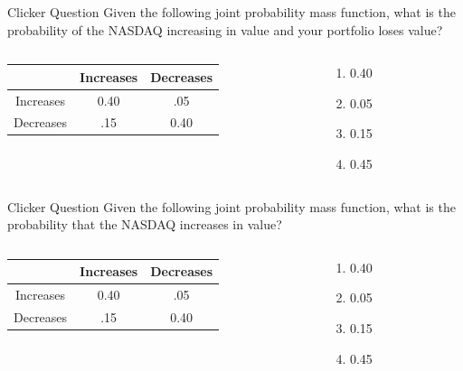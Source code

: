 \documentclass{beamer}
\begin{document}
\begin{frame}{Clicker Question}
	Given the following joint probability mass function, what is the probability of the NASDAQ increasing in value and your portfolio loses value?
	\begin{columns}
		\begin{column}{.8\textwidth}
			\begin{center}
				\begin{tabular}{ |c|c|c| }
					\hline
					\diagbox{NASDAQ}{Portfolio} & Increases & Decreases \\
					\hline
					Increases                        & 0.40      & .05       \\
					\hline
					Decreases                        & .15       & 0.40      \\
					\hline
				\end{tabular}
			\end{center}
		\end{column}
		\begin{column}{0.3\textwidth}
			\begin{enumerate}[label=(\alph*)]
				\item 0.40
				\item 0.05
				\item 0.15
				\item 0.45
			\end{enumerate}
		\end{column}
	\end{columns}
\end{frame}

\begin{frame}{Clicker Question}
	Given the following joint probability mass function, what is the probability that the NASDAQ increases in value?
	\begin{columns}
		\begin{column}{.8\textwidth}
			\begin{center}
				\begin{tabular}{ |c|c|c| }
					\hline
					\diagbox{NASDAQ}{Portfolio} & Increases & Decreases \\
					\hline
					Increases                        & 0.40      & .05       \\
					\hline
					Decreases                        & .15       & 0.40      \\
					\hline
				\end{tabular}
			\end{center}
		\end{column}

		\begin{column}{0.3\textwidth}
			\begin{enumerate}[label=(\alph*)]
				\item 0.40
				\item 0.05
				\item 0.15
				\item 0.45
			\end{enumerate}
		\end{column}
	\end{columns}
\end{frame}
\end{document}
